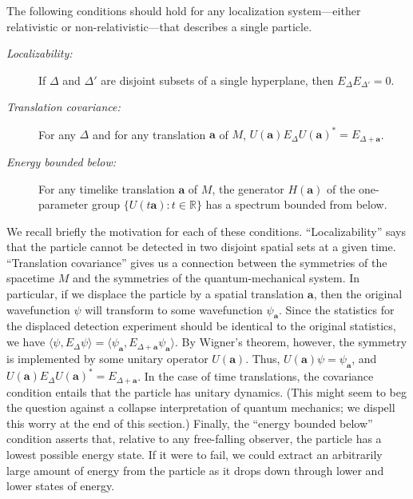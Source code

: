 \documentclass[12pt]{article}
\theoremstyle{remark}
\begin{document}
The following conditions should hold for any localization
system---either relativistic or non-relativistic---that describes a
single particle.
\begin{description}
\item[{\it Localizability:}] If $\Delta $ and $\Delta '$ are disjoint
  subsets of a single hyperplane, then \newline
  \mbox{$E_{\Delta}E_{\Delta '}=0$}.
\item[{\it Translation covariance:}] For any $\Delta$ and for any
  translation $\mathbf{a}$ of $M$, \newline
  $U(\mathbf{a})E_{\Delta}U(\mathbf{a})^{*}=E_{\Delta +\mathbf{a}}$.
\item[{\it Energy bounded below:}] For any timelike translation
  $\mathbf{a}$ of $M$, the generator $H(\mathbf{a})$ of the
  one-parameter group $\{ U(t\mathbf{a}):t\in \mathbb{R} \}$ has a
  spectrum bounded from below. \end{description} We recall briefly the
motivation for each of these conditions.  ``Localizability'' says that
the particle cannot be detected in two disjoint spatial sets at a
given time.  ``Translation covariance'' gives us a connection between
the symmetries of the spacetime $M$ and the symmetries of the
quantum-mechanical system.  In particular, if we displace the particle
by a spatial translation $\mathbf{a}$, then the original wavefunction
$\psi$ will transform to some wavefunction $\psi _{\mathbf{a}}$.
Since the statistics for the displaced detection experiment should be
identical to the original statistics, we have $\langle \psi
,E_{\Delta}\psi \rangle =\langle \psi _{\mathbf{a}},E_{\Delta
  +\mathbf{a}}\psi _{\mathbf{a}}\rangle$.  By Wigner's theorem,
however, the symmetry is implemented by some unitary operator
$U(\mathbf{a})$.  Thus, $U(\mathbf{a})\psi =\psi _{\mathbf{a}}$, and
$U(\mathbf{a})E_{\Delta}U(\mathbf{a})^{*}=E_{\Delta +\mathbf{a}}$.  In
the case of time translations, the covariance condition entails that
the particle has unitary dynamics.  (This might seem to beg the
question against a collapse interpretation of quantum mechanics; we
dispell this worry at the end of this section.)  Finally, the ``energy
bounded below'' condition asserts that, relative to any free-falling
observer, the particle has a lowest possible energy state.  If it were
to fail, we could extract an arbitrarily large amount of energy from
the particle as it drops down through lower and lower states of
energy.
\end{document}
